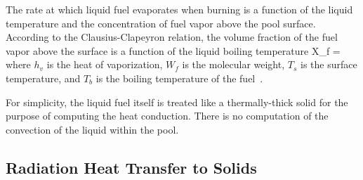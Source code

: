 \documentclass[11pt]{book}
\begin{document}
The rate at which liquid fuel evaporates when burning is a function of
the liquid temperature and the concentration of fuel vapor above the
pool surface. According to the Clausius-Clapeyron relation, the volume fraction of the
fuel vapor above the surface is a function of the liquid boiling temperature
\be X_f = \exp {}    \ee
where $h_v$ is the heat of vaporization, $W_f$ is the
molecular weight, $T_s$ is the surface temperature, and
$T_b$ is the boiling temperature of the fuel~\cite{Prasad:1}.

For simplicity, the liquid fuel itself is treated like a thermally-thick
solid for the purpose of computing the heat conduction. There is no
computation of the convection of the liquid within the pool.



\subsection{Radiation Heat Transfer to Solids}
\label{inradsection}
\end{document}
